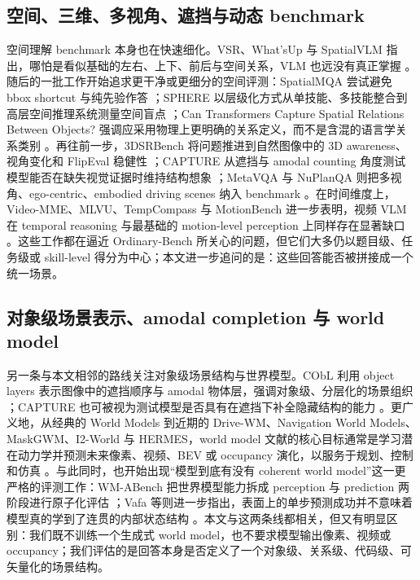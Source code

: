 \subsection{空间、三维、多视角、遮挡与动态 benchmark}

空间理解 benchmark 本身也在快速细化。VSR、What'sUp 与 SpatialVLM 指出，哪怕是看似基础的左右、上下、前后与空间关系，VLM 也远没有真正掌握 \cite{liu2023vsr,kamath2023whatsup,chen2024spatialvlm}。随后的一批工作开始追求更干净或更细分的空间评测：SpatialMQA 尝试避免 bbox shortcut 与纯先验作答 \cite{liu2025spatialmqa}；SPHERE 以层级化方式从单技能、多技能整合到高层空间推理系统测量空间盲点 \cite{zhang2025sphere}；Can Transformers Capture Spatial Relations Between Objects? 强调应采用物理上更明确的关系定义，而不是含混的语言学关系类别 \cite{wen2024spatialrelations}。再往前一步，3DSRBench 将问题推进到自然图像中的 3D awareness、视角变化和 FlipEval 稳健性 \cite{ma2025threedsrbench}；CAPTURE 从遮挡与 amodal counting 角度测试模型能否在缺失视觉证据时维持结构想象 \cite{pothiraj2025capture}；MetaVQA 与 NuPlanQA 则把多视角、ego-centric、embodied driving scenes 纳入 benchmark \cite{wang2025metavqa,park2025nuplanqa}。在时间维度上，Video-MME、MLVU、TempCompass 与 MotionBench 进一步表明，视频 VLM 在 temporal reasoning 与最基础的 motion-level perception 上同样存在显著缺口 \cite{fu2024videomme,zhou2024mlvu,liu2024tempcompass,hong2025motionbench}。这些工作都在逼近 Ordinary-Bench 所关心的问题，但它们大多仍以题目级、任务级或 skill-level 得分为中心；本文进一步追问的是：这些回答能否被拼接成一个统一场景。

\subsection{对象级场景表示、amodal completion 与 world model}

另一条与本文相邻的路线关注对象级场景结构与世界模型。CObL 利用 object layers 表示图像中的遮挡顺序与 amodal 物体层，强调对象级、分层化的场景组织 \cite{damaraju2025cobl}；CAPTURE 也可被视为测试模型是否具有在遮挡下补全隐藏结构的能力 \cite{pothiraj2025capture}。更广义地，从经典的 World Models 到近期的 Drive-WM、Navigation World Models、MaskGWM、I2-World 与 HERMES，world model 文献的核心目标通常是学习潜在动力学并预测未来像素、视频、BEV 或 occupancy 演化，以服务于规划、控制和仿真 \cite{ha2018worldmodels,wang2024drivewm,bar2025navigationwm,ni2025maskgwm,liao2025i2world,zhou2025hermes}。与此同时，也开始出现“模型到底有没有 coherent world model”这一更严格的评测工作：WM-ABench 把世界模型能力拆成 perception 与 prediction 两阶段进行原子化评估 \cite{gao2025wmabench}；Vafa 等则进一步指出，表面上的单步预测成功并不意味着模型真的学到了连贯的内部状态结构 \cite{vafa2024implicitwm}。本文与这两条线都相关，但又有明显区别：我们既不训练一个生成式 world model，也不要求模型输出像素、视频或 occupancy；我们评估的是回答本身是否定义了一个对象级、关系级、代码级、可矢量化的场景结构。

